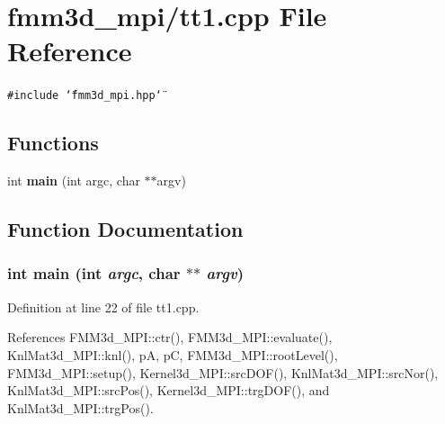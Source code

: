 \section{fmm3d\_\-mpi/tt1.cpp File Reference}
\label{tt1_8cpp}


{\tt \#include \char`\"{}fmm3d\_\-mpi.hpp\char`\"{}}\par
\subsection*{Functions}
\begin{CompactItemize}
\item 
int {\bf main} (int argc, char $\ast$$\ast$argv)
\end{CompactItemize}


\subsection{Function Documentation}
\subsubsection{\setlength{\rightskip}{0pt plus 5cm}int main (int {\em argc}, char $\ast$$\ast$ {\em argv})}\label{tt1_8cpp_30c4c19ff69d905e8e4c750b3af23485_30c4c19ff69d905e8e4c750b3af23485}




Definition at line 22 of file tt1.cpp.

References FMM3d\_\-MPI::ctr(), FMM3d\_\-MPI::evaluate(), Knl\-Mat3d\_\-MPI::knl(), p\-A, p\-C, FMM3d\_\-MPI::root\-Level(), FMM3d\_\-MPI::setup(), Kernel3d\_\-MPI::src\-DOF(), Knl\-Mat3d\_\-MPI::src\-Nor(), Knl\-Mat3d\_\-MPI::src\-Pos(), Kernel3d\_\-MPI::trg\-DOF(), and Knl\-Mat3d\_\-MPI::trg\-Pos().

